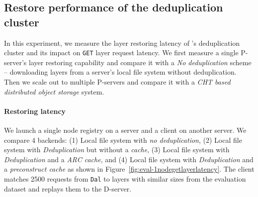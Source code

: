 

\subsection{Restore performance of the deduplication cluster}
\label{sec:eval-dedup}




In this experiment, we measure the layer restoring latency of \sysname's deduplication cluster and its impact on \texttt{GET} layer request latency.
We first measure a single P-server's layer restoring capability and compare it with a \emph{No deduplication} scheme --
downloading layers from a server's local file system without deduplication.
Then we scale out to multiple P-servers
and compare it with a \emph{CHT based distributed object storage} system.
%
%

\paragraph{Restoring latency}
We launch a single node registry on a server and a client on another server.
We compare 4 backends:
(1) Local file system with \emph{no deduplication},
(2) Local file system with \sysname \emph{Deduplication} but without a \emph{cache},
(3) Local file system with \sysname \emph{Deduplication} and a \emph{ARC cache}, and
(4) Local file system with \sysname \emph{Deduplication} and a \sysname \emph{preconstruct cache}
as shown in Figure~\ref{fig:eval-1nodegetlayerlatency}.
%
The client matches 2500 requests from \texttt{Dal} to layers with similar sizes from the evaluation dataset and replays them to the D-server.

